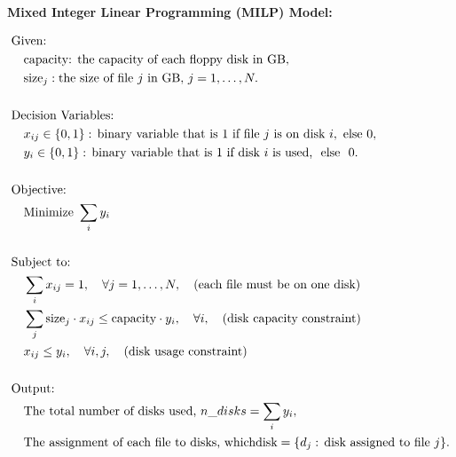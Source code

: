\documentclass{article}
\begin{document}
\textbf{Mixed Integer Linear Programming (MILP) Model:}

\begin{align*}
    &\text{Given:} \\
    &\quad \text{capacity: the capacity of each floppy disk in GB}, \\
    &\quad \text{size}_j: \text{the size of file } j \text{ in GB}, \, j = 1, \ldots, N. \\
    \\
    &\text{Decision Variables:} \\
    &\quad x_{ij} \in \{0, 1\}: \, \text{binary variable that is } 1 \text{ if file } j \text{ is on disk } i, \text{ else } 0, \\
    &\quad y_i \in \{0, 1\}: \, \text{binary variable that is } 1 \text{ if disk } i \text{ is used, \text{ else } 0.} \\
    \\
    &\text{Objective:} \\
    &\quad \text{Minimize } \sum_{i} y_i \\
    \\
    &\text{Subject to:} \\
    &\quad \sum_{i} x_{ij} = 1, \quad \forall j = 1, \ldots, N, \quad \text{(each file must be on one disk)} \\
    &\quad \sum_{j} \text{size}_j \cdot x_{ij} \leq \text{capacity} \cdot y_i, \quad \forall i, \quad \text{(disk capacity constraint)} \\
    &\quad x_{ij} \leq y_i, \quad \forall i, j, \quad \text{(disk usage constraint)} \\
    \\
    &\text{Output:} \\
    &\quad \text{The total number of disks used, } n\_disks = \sum_{i} y_i, \\
    &\quad \text{The assignment of each file to disks, } \text{whichdisk} = \{d_j: \, \text{disk assigned to file } j\}.
\end{align*}
\end{document}
